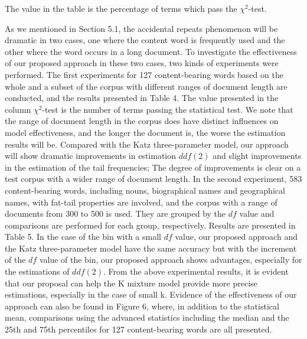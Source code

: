 \documentclass[english]{jnlp_1.4_rep}
\begin{document}
\begin{table}[b]

\small
The value in the table is the percentage of terms which pass the $\chi^{2}$-test. 
\par
\end{table}

As we mentioned in Section 5.1, the accidental repeats phenomenon will be dramatic in two cases, one where the content word is frequently used and
the other where the word occurs in a long document. To investigate the effectiveness of our proposed approach in these two cases, two kinds of
experiments were performed. The first experiments for 127 content-bearing words based on the whole and a subset of the corpus with different ranges
of document length are conducted, and the results presented in Table 4. The value presented in the column $\chi^{2}$-test is the number of terms
passing the statistical test. We note that the range of document length in the corpus does have distinct influences on model effectiveness, and the
longer the document is, the worse the estimation results will be. Compared with the Katz three-parameter model, our approach will show dramatic
improvements in estimation $\mathit{ddf}(2)$ and slight improvements in the estimation of the tail frequencies; The degree of improvements is clear
on a test corpus with a wider range of document length. In the second experiment, 583 content-bearing words, including nouns, biographical names and
geographical names, with fat-tail properties are involved, and the corpus with a range of documents from 300 to 500 is used. They are grouped by the
$\mathit{df}$ value and comparisons are performed for each group, respectively. Results are presented in Table 5. In the case of the bin with a
small $\mathit{df}$ value, our proposed approach and the Katz three-parameter model have the same accuracy but with the increment of the
$\mathit{df}$ value of the bin, our proposed approach shows advantages, especially for the estimations of $\mathit{ddf}(2)$. From the above
experimental results, it is evident that our proposal can help the K mixture model provide more precise estimations, especially in the case of small
k. Evidence of the effectiveness of our approach can also be found in Figure 6, where, in addition to the statistical mean, comparisons using the
advanced statistics including the median and the 25th and 75th percentiles for 127 content-bearing words are all presented.
\end{document}
